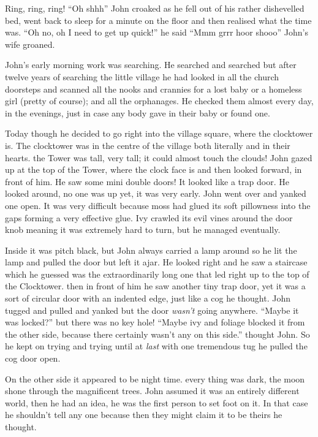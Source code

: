 Ring, ring, ring! ``Oh shhh'' John croaked as he fell out of his rather
dishevelled bed, went back to sleep for a minute on the floor and then
realised what the time was. ``Oh no, oh I need to get up quick!'' he
said ``Mmm grrr hoor shooo'' John's wife groaned.

John's early morning work was searching. He searched and searched but
after twelve years of searching the little village he had looked in all
the church doorsteps and scanned all the nooks and crannies for a lost
baby or a homeless girl (pretty of course); and all the orphanages. He
checked them almost every day, in the evenings, just in case any body
gave in their baby or found one.

Today though he decided to go right into the village square, where the
clocktower is. The clocktower was in the centre of the village both
literally and in their hearts. the Tower was tall, very tall; it could
almost touch the clouds! John gazed up at the top of the Tower, where
the clock face is and then looked forward, in front of him. He saw some
mini double doors! It looked like a trap door. He looked around, no one
was up yet, it was very early. John went over and yanked one open. It
was very difficult because moss had glued its soft pillowness into the
gaps forming a very effective glue. Ivy crawled its evil vines around
the door knob meaning it was extremely hard to turn, but he managed
eventually.

Inside it was pitch black, but John always carried a lamp around so he
lit the lamp and pulled the door but left it ajar. He looked right and
he saw a staircase which he guessed was the extraordinarily long one
that led right up to the top of the Clocktower. then in front of him he
saw another tiny trap door, yet it was a sort of circular door with an
indented edge, just like a cog he thought. John tugged and pulled and
yanked but the door \emph{wasn't} going anywhere. ``Maybe it was
locked?'' but there was no key hole! ``Maybe ivy and foliage blocked it
from the other side, because there certainly wasn't any on this side.''
thought John. So he kept on trying and trying until at \emph{last} with
one tremendous tug he pulled the cog door open.

On the other side it appeared to be night time. every thing was dark,
the moon shone through the magnificent trees. John assumed it was an
entirely different world, then he had an idea, he was the first person
to set foot on it. In that case he shouldn't tell any one because then
they might claim it to be theirs he thought.

